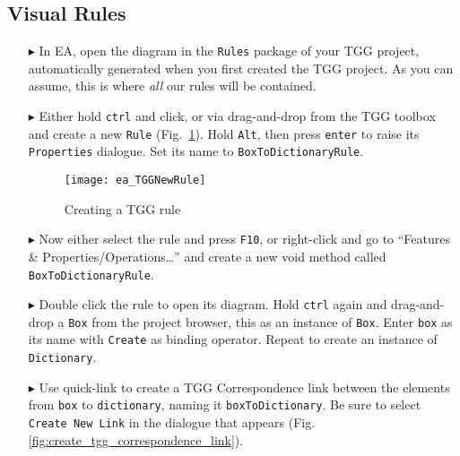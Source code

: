 \newpage
\hypertarget{rules vis}{}
\subsection{Visual Rules}
\visHeader

\begin{enumerate}
\item[$\blacktriangleright$] In EA, open the diagram in the \texttt{Rules} package of your TGG project, automatically generated when you first created the TGG
project. As you can assume, this is where \emph{all} our rules will be contained.

\vspace{0.5cm}

\item[$\blacktriangleright$] Either hold \texttt{ctrl} and click, or via drag-and-drop from the TGG toolbox and create a new \texttt{Rule}
(Fig.~\ref{fig:create_tgg_rule}). Hold \texttt{Alt}, then press \texttt{enter} to raise its \texttt{Properties} dialogue. Set its name to
\texttt{BoxToDictionaryRule}.

\vspace{0.5cm}

\begin{figure}[htbp]
\begin{center}
  \texttt{[image: ea\_TGGNewRule]}
  \caption{Creating a TGG rule}
  \label{fig:create_tgg_rule}
\end{center}
\end{figure}

\item[$\blacktriangleright$] Now either select the rule and press \texttt{F10}, or right-click and go to ``Features \& Properties/Operations\ldots'' and create
a new void method called \texttt{BoxToDictionaryRule}.

\vspace{0.5cm}

\item[$\blacktriangleright$] Double click the rule to open its diagram. Hold \texttt{ctrl} again and drag-and-drop a \texttt{Box} from the project browser,
this as an instance of \texttt{Box}. Enter \texttt{box} as its name with \texttt{Create} as binding operator. Repeat to create an instance of
\texttt{Dictionary}.

\vspace{0.5cm}

\item[$\blacktriangleright$] Use quick-link to create a TGG Correspondence link between the elements from \texttt{box} to  \texttt{dictionary}, naming it
\texttt{boxToDictionary}. Be sure to select \texttt{Create New Link} in the dialogue that appears (Fig. \ref{fig:create_tgg_correspondence_link}). 


\end{enumerate}
